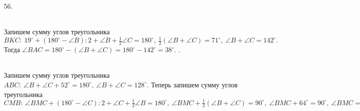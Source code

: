 56. \begin{figure}[ht!]
\end{figure}\\
Запишем сумму углов треугольника $BKC:\ 19^\circ+(180^\circ-\angle B):2+\angle B+\frac{1}{2}\angle C=180^\circ,\ \frac{1}{2}(\angle B+\angle C)=71^\circ,\ \angle B+\angle C=142^\circ.$ Тогда $\angle BAC=180^\circ-(\angle B+\angle C)=180^\circ-142^\circ=38^\circ.$\newpage
{}. \begin{figure}[ht!]
\end{figure}\\
Запишем сумму углов треугольника $ABC:\ \angle B+\angle C+52^\circ=180^\circ,\ \angle B+\angle C=128^\circ.$ Теперь запишем сумму углов треугольника $CMB:\ \angle BMC+(180^\circ-\angle C):2+\angle C+\frac{1}{2}\angle B=180^\circ,\ \angle BMC+\frac{1}{2}(\angle B+\angle C)=90^\circ,\ \angle BMC+64^\circ=90^\circ,\ \angle BMC=26^\circ.$\\
